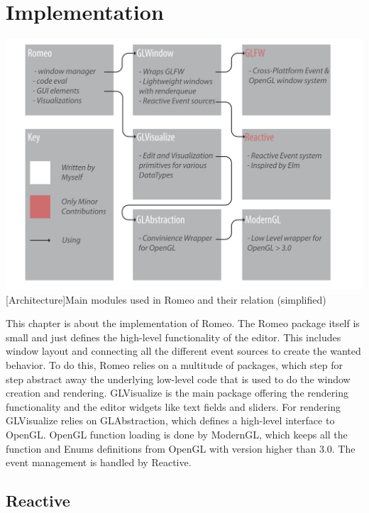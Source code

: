 \section{Implementation}


\vspace{1em}
\begin{minipage}{\linewidth}
    \centering
    \includegraphics[width=0.9\linewidth]{graphics/architecture.pdf}
    [Architecture]{Main modules used in Romeo and their relation (simplified)}
    \label{fig:architecture} 
\end{minipage}


This chapter is about the implementation of Romeo.
The Romeo package itself is small and just defines the high-level functionality of the editor.
This includes window layout and connecting all the different event sources to create the wanted behavior.
To do this, Romeo relies on a multitude of packages, which step for step abstract away the underlying low-level code that is used to do the window creation and rendering.
GLVisualize is the main package offering the rendering functionality and the editor widgets like text fields and sliders.
For rendering GLVisualize relies on GLAbstraction, which defines a high-level interface to \ac{OpenGL}.
\ac{OpenGL} function loading is done by ModernGL, which keeps all the function and Enums definitions from \ac{OpenGL} with version higher than 3.0.
The event management is handled by Reactive.

\subsection{Reactive}

